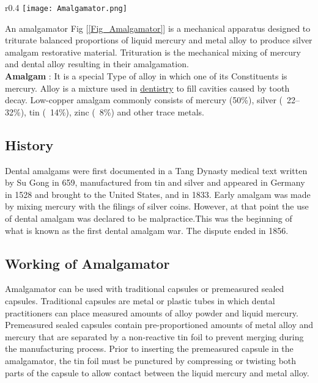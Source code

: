 \documentclass[12pt]{article}
\begin{document}
\begin{wrapfigure}{r}{0.4\textwidth}
	\vspace{-20pt}
	\label{Figure1}
    \texttt{[image: Amalgamator.png]}
    \caption{Amalgamator}
    \label{Fig_Amalgamator}
\end{wrapfigure}
   
 \normalsize
 An amalgamator Fig [\ref{Fig_Amalgamator}] is a mechanical apparatus designed to triturate balanced proportions of liquid mercury and metal alloy to produce silver amalgam restorative material. Trituration is the mechanical mixing of mercury and dental alloy resulting in their amalgamation.
 \\\textbf{Amalgam} : It is a special Type of alloy in which one of its Constituents is mercury. Alloy is a mixture used in \href{https://en.wikipedia.org/wiki/Dentistry}{dentistry} to fill cavities caused by tooth decay. Low-copper amalgam commonly consists of mercury (50\%), silver (~22--32\%), tin (~14\%), zinc (~8\%) and other trace metals.
 
 
 \subsection{History}
 Dental amalgams were first documented in a Tang Dynasty medical text written by Su Gong in 659, manufactured from tin and silver and appeared in Germany in 1528 and brought to the United States, and in 1833. Early amalgam was made by mixing mercury with the filings of silver coins.
 However, at that point the use of dental amalgam was declared to be malpractice.This was the beginning of what is known as the first dental amalgam war. The dispute ended in 1856\cite{wiki:Amalgam_dentistry}.

\subsection{Working of Amalgamator}


 Amalgamator can be used with traditional capsules or premeasured sealed capsules. Traditional capsules are metal or plastic tubes in which dental practitioners can place measured amounts of alloy powder and liquid mercury. Premeasured sealed capsules contain pre-proportioned amounts of metal alloy and mercury that are separated by a non-reactive tin foil to prevent merging during the manufacturing process. Prior to inserting the premeasured capsule in the amalgamator, the tin foil must be punctured by compressing or twisting both parts of the capsule to allow contact between the liquid mercury and metal alloy.
 
\end{document}

